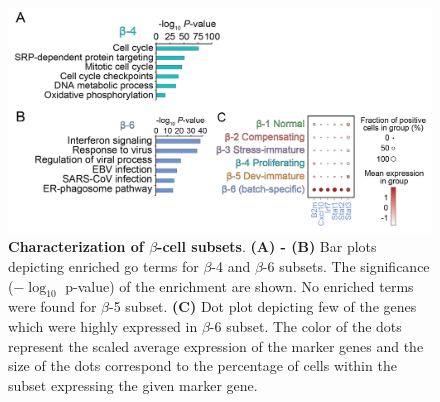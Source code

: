 \begin{figure}[H]
\centering
\includegraphics[width=\linewidth]{Appendix2/Fig/F3-1-v2-01.png}
\caption[Characterization of $\beta$-cell subsets]{\textbf{Characterization of $\beta$-cell subsets}. \textbf{(A) - (B)} Bar plots depicting enriched \gls{go} terms for $\beta$-4  and $\beta$-6 subsets. The significance ($-\log_{10}$ p-value) of the enrichment are shown. No enriched terms were found for $\beta$-5 subset. \textbf{(C)} Dot plot depicting few of the genes which were highly expressed in $\beta$-6 subset. The color of the dots represent the scaled average expression of the marker genes and the size of the dots correspond to the percentage of cells within the subset expressing the given marker gene.}
\label{fig:app_chp3_betasubsets}
\end{figure}



